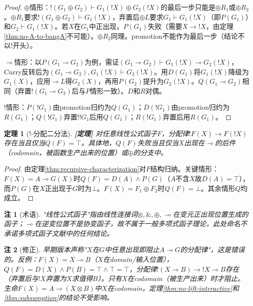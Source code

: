 \documentclass[11pt,a4paper]{article}
\newtheorem{theorem}{定理}
\newtheorem{remark}{注}
\newcommand{\lvl}[1]{\hfill\textbf{\footnotesize[#1]}}
\newcommand{\lvP}{\lvl{定理}}
\newcommand{\lolli}{\multimap}
\newcommand{\bang}{{!}}
\newcommand{\tensor}{\otimes}
\begin{document}
\begin{proof}
$\oplus$情形：$\bang(G_1\oplus G_2)\vdash G_1(\bang X)\oplus G_2(\bang X)$的最后一步只能是$\oplus R_1$或$\oplus R_2$。$\oplus R_1$要求$\bang(G_1\oplus G_2)\vdash G_1(\bang X)$，弃置后$\oplus L$要求$G_1\vdash G_1(\bang X)$（即$P(G_1)$）和$G_2\vdash G_1(\bang X)$。若$X$在$G_1$中正出现，$P(G_1)$失败（需要$X\to\bang X$，由定理\ref{thm:no-A-to-bangA}不可能）。$\oplus R_2$同理。promotion不能作为最后一步（结论不以$\bang$开头）。

$\lolli$情形：以$P(G_1\lolli G_2)$为例，需证$(G_1\lolli G_2)\vdash G_1(\bang X)\lolli G_2(\bang X)$，Curry反转后为$(G_1\lolli G_2),G_1(\bang X)\vdash G_2(\bang X)$。用$D(G_1)$将$G_1(\bang X)$降级为$G_1(X)$，应用$\lolli L$得$G_2(X)$，再用$P(G_2)$提升为$G_2(\bang X)$。$Q(G_1\lolli G_2)$相同（弃置$\bang(G_1\lolli G_2)$后与$P$情形一致）。$D$和$R$对偶。

$\bang$情形：$P(\bang G_1)$由promotion归约为$Q(G_1)$；$D(\bang G_1)$由promotion归约为$R(G_1)$；$Q(\bang G_1)$弃置$\bang\bang G_1$后用$Q(G_1)$；$R(\bang G_1)$弃置后用$R(G_1)$。
\end{proof}

\begin{theorem}[!-分配二分法]\label{thm:dichotomy}\lvP
对任意线性公式函子$F$，分配律$\bang F(X)\to F(\bang X)$存在当且仅当$Q(F)=\top$。具体地，$Q(F)$失败当且仅当$X$出现在$\lolli$的\emph{后件}（codomain，被函数生产出来的位置）或$\oplus$的分支中。
\end{theorem}

\begin{proof}
由定理\ref{thm:recursive-characterization}对$F$结构归纳。关键情形：$F(X)=A\lolli G(X)$时$Q(F)=D(A)\land P(G)$（$A$不含$X$故$D(A)=\top$），而$P(G)$在$X$正出现于$G$时为$\bot$。$F(X)=F_1\oplus F_2$时$Q(F)=\bot$。其余情形$Q$均成立。
\end{proof}

\begin{remark}[术语]
"线性公式函子"指由线性连接词$\tensor,\&,\oplus,\lolli$在变元正出现位置生成的函子；$\lolli$在逆变位置不是协变函子，故不属于一般多项式函子理论，此处命名不承诺多项式函子文献中的任何结论。
\end{remark}

\begin{remark}[修正]
早期版本声称"$X$在$G$中任意出现即阻止$A\lolli G$的分配律"，这是错误的。反例：$F(X)=X\lolli B$（$X$在domain/输入位置），$Q(F)=D(X)\land P(B)=\top\land\top=\top$，分配律$\bang(X\lolli B)\to\bang X\lolli B$存在（弃置后与$\bang X$弃置为$X$求值得$B$）。只有$X$在\emph{codomain}（被生产出来）时才阻止。生命$F(X)=A\lolli(X\tensor B)$中$X$在codomain，定理\ref{thm:no-lift-interactive}和\ref{thm:subsumption}的结论不受影响。
\end{remark}
\end{document}
